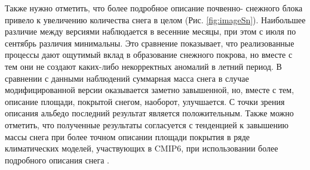 \documentclass[a4paper, fontsize=14pt]{scrartcl}
\begin{document}
Также нужно отметить, что более подробное описание почвенно- снежного блока привело к увеличению количества снега в целом (Рис. \ref{fig:imageSn}). Наибольшее различие между версиями наблюдается в весенние месяцы, при этом с июля по сентябрь различия минимальны. Это сравнение показывает, что реализованные процессы дают ощутимый вклад в образование снежного покрова, но вместе с тем они не создают каких-либо некорректных аномалий в летний период.  В сравнении с данными наблюдений суммарная масса снега в случае модифицированной версии оказывается заметно завышенной, но, вместе с тем, описание площади, покрытой снегом, наоборот, улучшается. С точки зрения описания альбедо последний результат является положительным. Также можно отметить, что полученные результаты согласуется с тенденцией к завышению массы снега при более точном описании площади покрытия в ряде климатических моделей, участвующих в CMIP6, при использовании более подробного описания снега \cite{Mudryk2020}.
\end{document}
